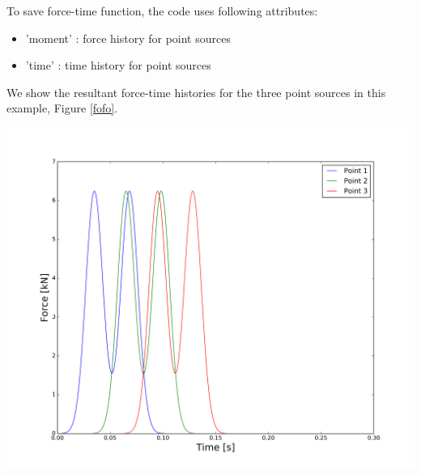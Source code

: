 To save force-time function, the code uses following attributes:\\
\begin{itemize}
\item 'moment'    : force history for point sources \\
\item 'time'      : time history for point sources    \\
\end{itemize}



We show the resultant force-time histories for the three point sources in this example, Figure \ref{fofo}. \\


\begin{center}
\leavevmode
\includegraphics[scale=0.45]{figures/Force_3point.png} 
\label{fofo} 
\vspace{1cm}
\end{center}






















 